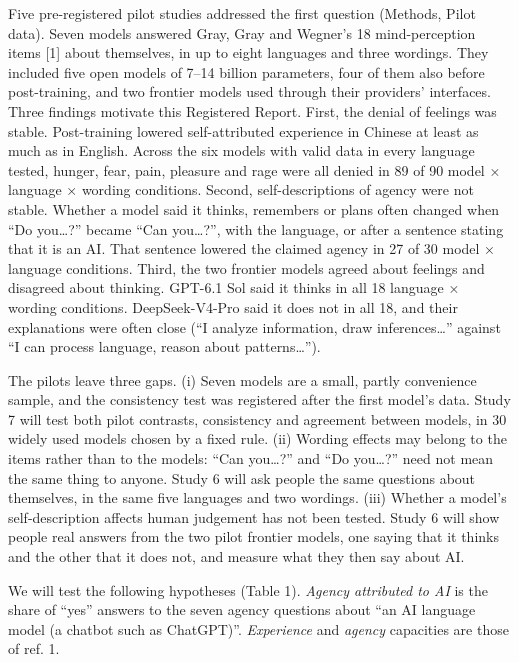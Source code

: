 \documentclass[
  11pt,
]{article}
\begin{document}
Five pre-registered pilot studies addressed the first question (Methods,
Pilot data). Seven models answered Gray, Gray and Wegner's 18
mind-perception items {[}1{]} about themselves, in up to eight languages
and three wordings. They included five open models of 7--14 billion
parameters, four of them also before post-training, and two frontier
models used through their providers' interfaces. Three findings motivate
this Registered Report. First, the denial of feelings was stable.
Post-training lowered self-attributed experience in Chinese at least as
much as in English. Across the six models with valid data in every
language tested, hunger, fear, pain, pleasure and rage were all denied
in 89 of 90 model × language × wording conditions. Second,
self-descriptions of agency were not stable. Whether a model said it
thinks, remembers or plans often changed when ``Do you\ldots?'' became
``Can you\ldots?'', with the language, or after a sentence stating that
it is an AI. That sentence lowered the claimed agency in 27 of 30 model
× language conditions. Third, the two frontier models agreed about
feelings and disagreed about thinking. GPT-6.1 Sol said it thinks in all
18 language × wording conditions. DeepSeek-V4-Pro said it does not in
all 18, and their explanations were often close (``I analyze
information, draw inferences\ldots{}'' against ``I can process language,
reason about patterns\ldots{}'').

The pilots leave three gaps. (i) Seven models are a small, partly
convenience sample, and the consistency test was registered after the
first model's data. Study 7 will test both pilot contrasts, consistency
and agreement between models, in 30 widely used models chosen by a fixed
rule. (ii) Wording effects may belong to the items rather than to the
models: ``Can you\ldots?'' and ``Do you\ldots?'' need not mean the same
thing to anyone. Study 6 will ask people the same questions about
themselves, in the same five languages and two wordings. (iii) Whether a
model's self-description affects human judgement has not been tested.
Study 6 will show people real answers from the two pilot frontier
models, one saying that it thinks and the other that it does not, and
measure what they then say about AI.

We will test the following hypotheses (Table 1). \emph{Agency attributed
to AI} is the share of ``yes'' answers to the seven agency questions
about ``an AI language model (a chatbot such as ChatGPT)''.
\emph{Experience} and \emph{agency} capacities are those of ref. 1.
\end{document}
